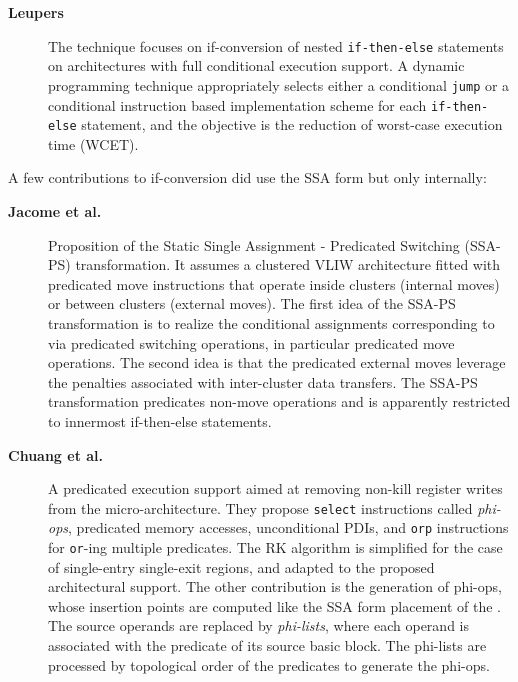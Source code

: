 \begin{description}
\item[\textbf{Leupers~\cite{Leupers:1999:DATE}}] The technique focuses on
if-conversion of nested \texttt{if-then-else} statements on architectures with full
conditional execution support. A dynamic programming technique appropriately
selects either a conditional \texttt{jump} or a conditional instruction based
implementation scheme for each \texttt{if-then-else} statement, and the objective is the
reduction of worst-case execution time (WCET).

\end{description}

A few contributions to if-conversion did use the SSA form
but only internally: \begin{description}

\item[\textbf{Jacome et al.~\cite{Jacome01clusteredvliw}}] Proposition of the Static
Single Assignment - Predicated Switching (SSA-PS) transformation. It assumes a
clustered VLIW architecture fitted with predicated move instructions that
operate inside clusters (internal moves) or between clusters (external moves).
The first idea of the SSA-PS transformation is to realize the conditional
assignments corresponding to \phifuns via predicated switching
operations, in particular predicated move operations. The second idea is that
the predicated external moves leverage the penalties associated with
inter-cluster data transfers. The SSA-PS transformation predicates non-move
operations and is apparently restricted to innermost if-then-else statements.

\item[\textbf{Chuang et al.~\cite{Chuang:2003:CGO}}] A predicated execution
support aimed at removing non-kill register writes from the micro-architecture.
They propose \texttt{select} instructions called \emph{phi-ops}, predicated memory
accesses, unconditional PDIs, and \texttt{orp} instructions for \texttt{or}-ing multiple
predicates. The RK algorithm is simplified for the case of single-entry single-exit
regions, and adapted to the proposed architectural support.
The other contribution is the generation of {phi-ops}, whose insertion points
are computed like the SSA form placement of the \phifuns. The
\phifuns source operands are replaced by \emph{phi-lists}, where each
operand is associated with the predicate of its source basic block. The
phi-lists are processed by topological order of the predicates to
generate the {phi-ops}.

\end{description}


